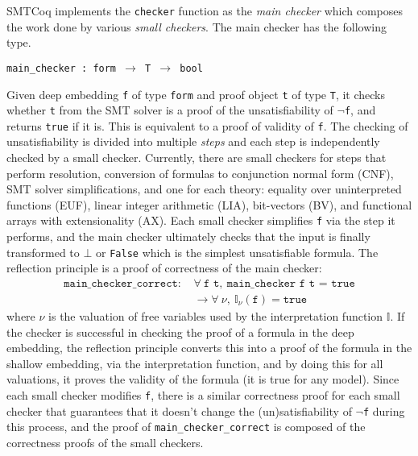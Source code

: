 \documentclass{article}
\begin{document}
	SMTCoq implements the \texttt{checker}
	function as the \textit{main checker}
	which composes the work done 
	by various \textit{small checkers}. 
	The main checker has the following 
	type.
	\begin{center}
		\texttt{main\_checker : 
			form $\to$ T $\to$ bool}	
	\end{center}
	Given deep embedding \texttt{f} of 
	type \texttt{form}
	and proof object \texttt{t} of type 
	\texttt{T}, it checks whether \texttt{t} 
	from the SMT solver 
	is a proof of the unsatisfiability of
	\texttt{$\neg$f}, and returns 
	\texttt{true} if it is. This is 
	equivalent to a proof of validity of 
	\texttt{f}. The checking of 
	unsatisfiability is divided into 
	multiple \textit{steps}
	and each step is independently checked 
	by a small checker. Currently, there are 
	small checkers for steps that perform 
	resolution, conversion of formulas to 
	conjunction normal form (CNF), SMT 
	solver simplifications, and one for 
	each theory: equality over 
	uninterpreted functions (EUF), linear 
	integer arithmetic (LIA), bit-vectors 
	(BV), and functional arrays with 
	extensionality (AX). Each small
	checker simplifies \texttt{f} via 
	the step it performs, and the main 
	checker ultimately checks that the 
	input is finally transformed to 
	$\bot$ or \texttt{False} which is the 
	simplest unsatisfiable formula.
	The reflection principle is a proof of 
	correctness of the main checker:
	\begin{align*}
		\texttt{main\_checker\_correct: } 
		&\forall\ \texttt{f t},\ 
		\texttt{main\_checker f t = true}\\
		&\to \forall\ \nu,\ \mathbb{I}_{\nu}
		(\texttt{f}) = \texttt{true}
	\end{align*}
	where $\nu$ is the valuation 
	of free variables used by 
	the interpretation function 
	$\mathbb{I}$. If the checker 
	is successful in checking the 
	proof of a formula in the deep
	embedding, the reflection 
	principle converts this into 
	a proof of the formula in the 
	shallow embedding, via the 
	interpretation function, and 
	by doing this for all valuations,
	it proves the validity of the 
	formula (it is true for any 
	model). Since each small
	checker modifies \texttt{f}, 
	there is a similar correctness 
	proof for each small checker 
	that guarantees that it doesn't
	change the (un)satisfiability of 
	\texttt{$\neg$f} during this process, 
	and the proof of 
	\texttt{main\_checker\_correct}
	is composed of the correctness
	proofs of the small checkers.
	
\end{document}
